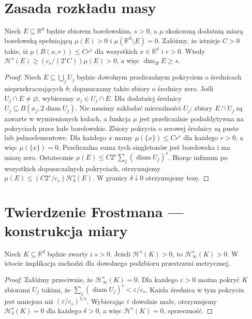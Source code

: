\section{Zasada rozkładu masy}
\begin{twierdzenie}
\label{thm:mass-distribution-26}
Niech $E\subseteq\mathbb R^d$ będzie zbiorem borelowskim,
$s>0$, a $\mu$ skończoną dodatnią miarą borelowską
spełniającą $\mu(E)>0$ i $\mu(\mathbb R^d\setminus E)=0$.
Załóżmy, że istnieje $C>0$ takie, iż
$\mu(B(x,r))\le Cr^s$ dla wszystkich
$x\in\mathbb R^d$ i $r>0$. Wtedy
$\mathcal H^s(E)\ge(c_s/(2^sC))\mu(E)>0$,
a więc $\dim_HE\ge s$.
\end{twierdzenie}
\begin{proof}
Niech $E\subseteq\bigcup_jU_j$ będzie dowolnym
przeliczalnym pokryciem o średnicach nieprzekraczających
$\delta$; dopuszczamy także zbiory o średnicy zero.
Jeśli $U_j\cap E\ne\varnothing$, wybierzmy
$x_j\in U_j\cap E$. Dla dodatniej średnicy
$U_j\subseteq B(x_j,2\operatorname{diam}U_j)$.
Nie musimy zakładać mierzalności $U_j$: zbiory
$E\cap U_j$ są zawarte w wymienionych kulach,
a funkcja $\mu$ jest przeliczalnie podaddytywna
na pokryciach przez kule borelowskie. Zbiory pokrycia
o zerowej średnicy są puste lub jednoelementowe.
Dla każdego $x$ mamy $\mu(\{x\})\le Cr^s$ dla
każdego $r>0$, a więc $\mu(\{x\})=0$.
Przeliczalna suma tych singletonów jest borelowska
i ma miarę zero. Ostatecznie
$\mu(E)\le C2^s\sum_j(\operatorname{diam}U_j)^s$.
Biorąc infimum po wszystkich dopuszczalnych pokryciach,
otrzymujemy $\mu(E)\le(C2^s/c_s)\mathcal H^s_\delta(E)$. W granicy
$\delta\downarrow0$ otrzymujemy tezę.
\end{proof}

\section{Twierdzenie Frostmana — konstrukcja miary}
\begin{lemat}
\label{lem:positive-content-26}
Niech $K\subseteq\mathbb R^d$ będzie zwarty i $s>0$.
Jeżeli $\mathcal H^s(K)>0$, to
$\mathcal H^s_\infty(K)>0$.
W istocie implikacja zachodzi dla dowolnego podzbioru
przestrzeni metrycznej.
\end{lemat}
\begin{proof}
Załóżmy przeciwnie, że $\mathcal H^s_\infty(K)=0$.
Dla każdego $\varepsilon>0$ można pokryć $K$
zbiorami $U_j$ takimi, że
$\sum_j(\operatorname{diam}U_j)^s<\varepsilon/c_s$.
Każda średnica w tym pokryciu jest mniejsza niż
$(\varepsilon/c_s)^{1/s}$. Wybierając
$\varepsilon$ dowolnie małe, otrzymujemy
$\mathcal H^s_\delta(K)=0$ dla każdego $\delta>0$,
a więc $\mathcal H^s(K)=0$, sprzeczność.
\end{proof}

